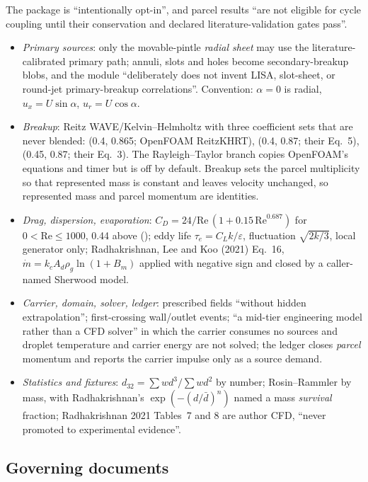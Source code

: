  The package is ``intentionally opt-in'', and parcel results ``are not eligible for cycle coupling until their conservation and declared literature-validation gates pass''.
\begin{itemize}
\item \emph{Primary sources}: only the movable-pintle \emph{radial sheet} may use the literature-calibrated primary path; annuli, slots and holes become secondary-breakup blobs, and the module ``deliberately does not invent LISA, slot-sheet, or round-jet primary-breakup correlations''. Convention: $\alpha=0$ is radial, $u_x=U\sin\alpha$, $u_r=U\cos\alpha$.
\item \emph{Breakup}: Reitz WAVE/Kelvin--Helmholtz with three coefficient sets that are never blended:  (0.4, 0.865; OpenFOAM ReitzKHRT),  (0.4, 0.87; their Eq.~5),  (0.45, 0.87; their Eq.~3). The Rayleigh--Taylor branch copies OpenFOAM's equations and timer but is off by default. Breakup sets the parcel multiplicity so that represented mass is constant and leaves velocity unchanged, so represented mass and parcel momentum are identities.
\item \emph{Drag, dispersion, evaporation}: $C_D=24/\mathrm{Re}\,(1+0.15\,\mathrm{Re}^{0.687})$ for $0<\mathrm{Re}\le1000$, 0.44 above (); eddy life $\tau_e=C_Lk/\varepsilon$, fluctuation $\sqrt{2k/3}$, local generator only; Radhakrishnan, Lee and Koo (2021) Eq.~16, $\dot m=k_cA_d\rho_g\ln(1+B_m)$ applied with negative sign and closed by a caller-named Sherwood model.
\item \emph{Carrier, domain, solver, ledger}: prescribed fields ``without hidden extrapolation''; first-crossing wall/outlet events; ``a mid-tier engineering model rather than a CFD solver'' in which the carrier consumes no sources and droplet temperature and carrier energy are not solved; the ledger closes \emph{parcel} momentum and reports the carrier impulse only as a source demand.
\item \emph{Statistics and fixtures}: $d_{32}=\sum wd^3/\sum wd^2$ by number; Rosin--Rammler by mass, with Radhakrishnan's $\exp(-(d/\bar d)^n)$ named a mass \emph{survival} fraction; Radhakrishnan 2021 Tables~7 and 8 are author CFD, ``never promoted to experimental evidence''.
\end{itemize}

\subsection{Governing documents}

